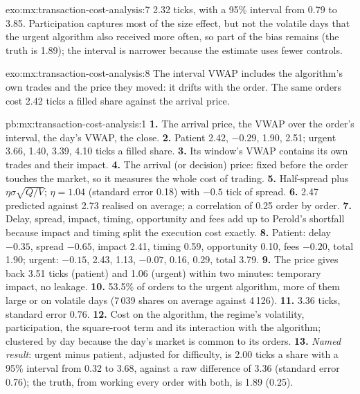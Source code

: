 \begin{solution}{exo:mx:transaction-cost-analysis:7}
2.32 ticks, with a 95\% interval from 0.79 to 3.85. Participation captures most of the size effect, but not the volatile days that the urgent
algorithm also received more often, so part of the bias remains (the truth is 1.89); the interval is narrower because the estimate uses fewer
controls.
\end{solution}

\begin{solution}{exo:mx:transaction-cost-analysis:8}
The interval VWAP includes the algorithm's own trades and the price they moved: it drifts with the order. The same orders cost 2.42 ticks a filled share
against the arrival price.
\end{solution}

\begin{solution}{pb:mx:transaction-cost-analysis:1}
\textbf{1.} The arrival price, the VWAP over the order's interval, the day's VWAP, the close.
\textbf{2.} Patient 2.42, $-0.29$, 1.90, 2.51; urgent 3.66, 1.40, 3.39, 4.10 ticks a filled share.
\textbf{3.} Its window's VWAP contains its own trades and their impact.
\textbf{4.} The arrival (or decision) price: fixed before the order touches the market, so it measures the whole cost of trading.
\textbf{5.} Half-spread plus $\eta\sigma\sqrt{Q/V}$; $\eta=1.04$ (standard error 0.18) with $-0.5$ tick of spread.
\textbf{6.} 2.47 predicted against 2.73 realised on average; a correlation of 0.25 order by order.
\textbf{7.} Delay, spread, impact, timing, opportunity and fees add up to Perold's shortfall because impact and timing split the execution cost exactly.
\textbf{8.} Patient: delay $-0.35$, spread $-0.65$, impact 2.41, timing 0.59, opportunity 0.10, fees $-0.20$, total 1.90; urgent: $-0.15$, 2.43, 1.13,
$-0.07$, 0.16, 0.29, total 3.79.
\textbf{9.} The price gives back 3.51 ticks (patient) and 1.06 (urgent) within two minutes: temporary impact, no leakage.
\textbf{10.} 53.5\% of orders to the urgent algorithm, more of them large or on volatile days (7\,039 shares on average against 4\,126).
\textbf{11.} 3.36 ticks, standard error 0.76.
\textbf{12.} Cost on the algorithm, the regime's volatility, participation, the square-root term and its interaction with the algorithm; clustered
by day because the day's market is common to its orders.
\textbf{13.} \emph{Named result}: urgent minus patient, adjusted for difficulty, is 2.00 ticks a share with a 95\% interval from 0.32 to 3.68, against
a raw difference of 3.36 (standard error 0.76); the truth, from working every order with both, is 1.89 (0.25).

\end{solution}
